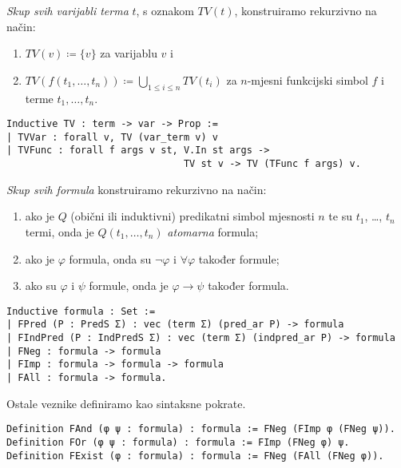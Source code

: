 \begin{definition}
  \textit{Skup svih varijabli terma} \(t\), s oznakom \(\mathit{TV}(t)\), konstruiramo rekurzivno na način:
  \begin{enumerate}
  \item \( \mathit{TV}(v) \coloneq \{ v \} \) za varijablu \(v\) i
  \item \( \mathit{TV}(f(t_{1}, \ldots, t_{n})) \coloneq \bigcup_{1 \le i \le n} \mathit{TV}(t_{i}) \) za \(n\)-mjesni funkcijski simbol \(f\) i terme \(t_{1}, \ldots, t_{n}\).
  \end{enumerate}
\begin{verbatim}
Inductive TV : term -> var -> Prop :=
| TVVar : forall v, TV (var_term v) v
| TVFunc : forall f args v st, V.In st args ->
                               TV st v -> TV (TFunc f args) v.
\end{verbatim}
\end{definition}

\begin{definition}\label{def:formula}
  \textit{Skup svih formula} konstruiramo rekurzivno na način:
  \begin{enumerate}
  \item ako je \(Q\) (obični ili induktivni) predikatni simbol mjesnosti \(n\) te su \(t_{1}\), \ldots, \(t_{n}\) termi,
    onda je \(Q(t_{1}, \ldots, t_{n})\) \textit{atomarna} formula;
  \item ako je \(\varphi\) formula, onda su \(\neg\varphi\) i \(\forall\varphi\) također formule;
  \item ako su \(\varphi\) i \(\psi\) formule, onda je \(\varphi \rightarrow \psi\) također formula.
  \end{enumerate}
\begin{verbatim}
Inductive formula : Set :=
| FPred (P : PredS Σ) : vec (term Σ) (pred_ar P) -> formula 
| FIndPred (P : IndPredS Σ) : vec (term Σ) (indpred_ar P) -> formula 
| FNeg : formula -> formula 
| FImp : formula -> formula -> formula 
| FAll : formula -> formula.
\end{verbatim}
  \noindent Ostale veznike definiramo kao sintaksne pokrate.
\begin{verbatim}
Definition FAnd (φ ψ : formula) : formula := FNeg (FImp φ (FNeg ψ)).
Definition FOr (φ ψ : formula) : formula := FImp (FNeg φ) ψ.
Definition FExist (φ : formula) : formula := FNeg (FAll (FNeg φ)).
\end{verbatim}
\end{definition}

